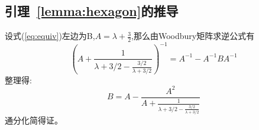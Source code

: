 \subsection{引理~\ref{lemma:hexagon}的推导}\label{B_F_4}
  设式(\ref{eq:equiv})左边为B,$A=\lambda+\frac{3}{2}$,那么由Woodbury矩阵求逆公式有
  \[
  (A+\frac{1}{\lambda+3/2-\frac{3/2}{\lambda+3/2}})^{-1}=A^{-1}-A^{-1}BA^{-1}
  \]
  整理得:
  \[
  B=A-\frac{A^2}{A+\frac{1}{\lambda+3/2-\frac{3/2}{\lambda+3/2}}}
  \]
  通分化简得证。
